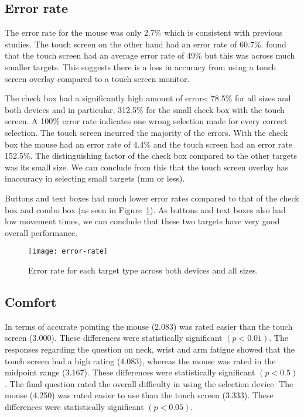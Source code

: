 \documentclass{elsart}
\begin{document}
\subsection{Error rate}
\label{sec-results-errorrate}

The error rate for the mouse was only 2.7\% which is consistent with
previous studies. The touch screen on the other hand had an error rate
of 60.7\%. \citet{Sear-A-1991-IJMMS} found that the touch screen had
an average error rate of 49\% but this was across much smaller targets.
This suggests there is a loss in accuracy from using a touch screen
overlay compared to a touch screen monitor.

The check box had a significantly high amount of errors; 78.5\% for all
sizes and both devices and in particular, 312.5\% for the small check box
with the touch screen. A 100\% error rate indicates one wrong selection
made for every correct selection. The touch screen incurred the majority
of the errors. With the check box the mouse had an error rate of 4.4\%
and the touch screen had an error rate 152.5\%. The distinguishing factor
of the check box compared to the other targets was its small size. We
can conclude from this that the touch screen overlay has inaccuracy in
selecting small targets (\unit[4]{mm} or less).

Buttons and text boxes had much lower error rates compared to that of
the check box and combo box (as seen in Figure~\ref{fig-error-rate}). As
buttons and text boxes also had low movement times, we can conclude that
these two targets have very good overall performance.

\begin{figure}
	\centering
	\texttt{[image: error-rate]}
	\caption{Error rate for each target type across both devices and all
	sizes.}
	\label{fig-error-rate}
\end{figure}


\subsection{Comfort}
\label{sec-results-comfort}

In terms of accurate pointing the mouse (2.083) was rated easier than
the touch screen (3.000). These differences were statistically
significant \((p < 0.01)\). The responses regarding the question on
neck, wrist and arm fatigue showed that the touch screen had a high
rating (4.083), whereas the mouse was rated in the midpoint range
(3.167). These differences were statistically significant \((p < 0.5)\).
The final question rated the overall difficulty in using the selection
device. The mouse (4.250) was rated easier to use than the touch screen
(3.333). These differences were statistically significant \((p <
0.05)\).
\end{document}
